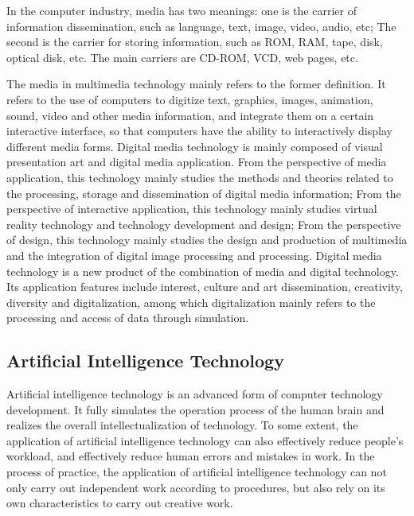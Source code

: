 \documentclass[conference]{IEEEtran}
\begin{document}
In the computer industry, media has two meanings: one is the carrier of information dissemination, such as language, text, image, video, audio, etc; The second is the carrier for storing information, such as ROM, RAM, tape, disk, optical disk, etc. The main carriers are CD-ROM, VCD, web pages, etc.

The media in multimedia technology mainly refers to the former definition. It refers to the use of computers to digitize text, graphics, images, animation, sound, video and other media information, and integrate them on a certain interactive interface, so that computers have the ability to interactively display different media forms. Digital media technology is mainly composed of visual presentation art and digital media application. From the perspective of media application, this technology mainly studies the methods and theories related to the processing, storage and dissemination of digital media information; From the perspective of interactive application, this technology mainly studies virtual reality technology and technology development and design; From the perspective of design, this technology mainly studies the design and production of multimedia and the integration of digital image processing and processing. Digital media technology is a new product of the combination of media and digital technology. Its application features include interest, culture and art dissemination, creativity, diversity and digitalization, among which digitalization mainly refers to the processing and access of data through simulation.

\subsection{Artificial Intelligence Technology}
Artificial intelligence technology is an advanced form of computer technology development. It fully simulates the operation process of the human brain and realizes the overall intellectualization of technology. To some extent, the application of artificial intelligence technology can also effectively reduce people's workload, and effectively reduce human errors and mistakes in work. In the process of practice, the application of artificial intelligence technology can not only carry out independent work according to procedures, but also rely on its own characteristics to carry out creative work.
\end{document}

